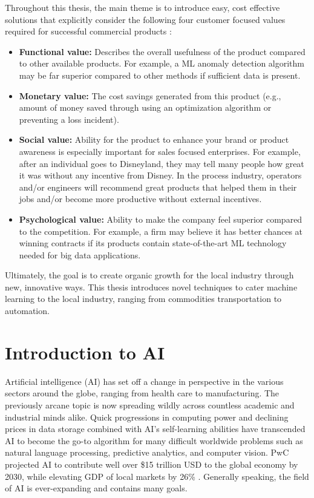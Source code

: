 Throughout this thesis, the main theme is to introduce easy, cost effective solutions that explicitly consider the following four customer focused values required for successful commercial products \cite{marketing}:
\begin{itemize}
    \item \textbf{Functional value:} Describes the overall usefulness of the product compared to other available products.  For example, a ML anomaly detection algorithm may be far superior compared to other methods if sufficient data is present.
    \item \textbf{Monetary value:} The cost savings generated from this product (e.g., amount of money saved through using an optimization algorithm or preventing a loss incident).  
    \item \textbf{Social value:} Ability for the product to enhance your brand or product awareness is especially important for sales focused enterprises.  For example, after an individual goes to Disneyland, they may tell many people how great it was without any incentive from Disney.  In the process industry, operators and/or engineers will recommend great products that helped them in their jobs and/or become more productive without external incentives.
    \item \textbf{Psychological value:} Ability to make the company feel superior compared to the competition.  For example, a firm may believe it has better chances at winning contracts if its products contain state-of-the-art ML technology needed for big data applications.
\end{itemize}
Ultimately, the goal is to create organic growth for the local industry through new, innovative ways. This thesis introduces novel techniques to cater machine learning to the local industry, ranging from commodities transportation to automation.

\section{Introduction to AI}
Artificial intelligence (AI) has set off a change in perspective in the various sectors around the globe, ranging from health care to manufacturing.  The previously arcane topic is now spreading wildly across countless academic and industrial minds alike. Quick progressions in computing power and declining prices in data storage combined with AI's self-learning abilities have transcended AI to become the go-to algorithm for many difficult worldwide problems such as natural language processing, predictive analytics, and computer vision.  PwC projected AI to contribute well over \$15 trillion USD to the global economy by 2030, while elevating GDP of local markets by 26\%  \cite{pwc}. Generally speaking, the field of AI is ever-expanding and contains many goals.

